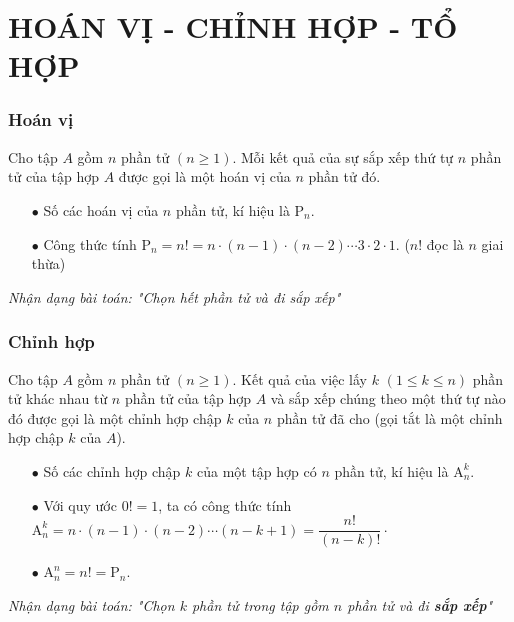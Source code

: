 \section{HOÁN VỊ - CHỈNH HỢP - TỔ HỢP}
\subsubsection{Hoán vị}
Cho tập $A$ gồm $n$ phần tử $\left(n\ge 1\right)$. Mỗi kết quả của sự sắp xếp thứ tự $n$ phần tử của tập hợp $A$ được gọi là một hoán vị của $n$ phần tử đó.
\begin{boxkn}
	\begin{itemize}
		\item [$\bullet$] Số các hoán vị của $n$ phần tử, kí hiệu là $\mathrm{P}_n$.
		\item [$\bullet$] Công thức tính $\mathrm{P}_n = n! = n\cdot (n - 1)\cdot (n - 2) \cdots 3\cdot 2\cdot 1$. ($n!$ đọc là $n$ giai thừa)
	\end{itemize}
\end{boxkn}
\noindent
\textit{Nhận dạng bài toán: "Chọn hết phần tử và đi sắp xếp"}
\subsubsection{Chỉnh hợp}
Cho tập $A$ gồm $n$ phần tử $\left(n\ge 1\right)$. Kết quả của việc lấy $k$ $\left(1\le k\le n\right)$ phần tử khác nhau từ $n$ phần tử của tập hợp $A$ và sắp xếp chúng theo một thứ tự nào đó được gọi là một chỉnh hợp chập $k$ của $n$ phần tử đã cho (gọi tắt là một chỉnh hợp chập $k$ của $A$).
\begin{boxkn}
	\begin{itemize}
		\item [$\bullet$] Số các chỉnh hợp chập $k$ của một tập hợp có $n$ phần tử, kí hiệu là
		$\mathrm{A}_n^k$.
		\item [$\bullet$] Với quy ước $0! = 1$, ta có công thức tính $\mathrm{A}_n^k = n\cdot (n - 1)\cdot (n - 2)\cdots (n - k + 1) = \dfrac{n!}{(n - k)!}\cdot$
		\item [$\bullet$] $\mathrm{A}_n^n = n! = \mathrm{P}_n$.
	\end{itemize}
\end{boxkn}
\noindent
\textit{Nhận dạng bài toán: "Chọn $k$ phần tử trong tập gồm $n$ phần tử và đi \textbf{sắp xếp}"}
